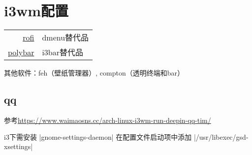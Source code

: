 \section{i3wm配置}

\begin{tabular}{rl}
\hline
\href{https://github.com/davatorium/rofir}{rofi}
& dmenu替代品 \\
\href{https://github.com/polybar/polybar/wiki}{polybar}
& i3bar替代品
\end{tabular}

其他软件：feh（壁纸管理器）, compton（透明终端和bar）

\subsection{qq}
参考\url{https://www.waimaosns.cc/arch-linux-i3wm-run-deepin-qq-tim/}

i3下需安装 |gnome-settings-daemon| 在配置文件启动项中添加
|/usr/libexec/gsd-xsettings|
